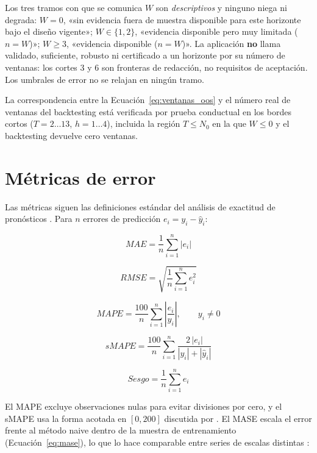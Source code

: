 \documentclass[12pt]{article}
\begin{document}
Los tres tramos con que se comunica $W$ son \emph{descriptivos} y ninguno niega ni degrada: $W = 0$, «sin evidencia fuera de muestra disponible para este horizonte bajo el dise\~no vigente»; $W \in \{1,2\}$, «evidencia disponible pero muy limitada ($n=W$)»; $W \geq 3$, «evidencia disponible ($n=W$)». La aplicaci\'on \textbf{no} llama validado, suficiente, robusto ni certificado a un horizonte por su n\'umero de ventanas: los cortes 3 y 6 son fronteras de redacci\'on, no requisitos de aceptaci\'on. Los umbrales de error no se relajan en ning\'un tramo.

La correspondencia entre la Ecuaci\'on~\ref{eq:ventanas_oos} y el n\'umero real de ventanas del backtesting est\'a verificada por prueba conductual en los bordes cortos ($T = 2 \dots 13$, $h = 1 \dots 4$), incluida la regi\'on $T \leq N_0$ en la que $W \leq 0$ y el backtesting devuelve cero ventanas.

\section{M\'etricas de error}
\label{sec:metricas}

Las m\'etricas siguen las definiciones est\'andar del an\'alisis de exactitud de pron\'osticos \citep{hyndman_koehler2006,hyndman2021fpp3}. Para $n$ errores de predicci\'on $e_i = y_i - \hat{y}_i$:

\begin{equation}
MAE = \frac{1}{n}\sum_{i=1}^{n}|e_i|
\label{eq:mae}
\end{equation}

\begin{equation}
RMSE = \sqrt{\frac{1}{n}\sum_{i=1}^{n}e_i^{2}}
\label{eq:rmse}
\end{equation}

\begin{equation}
MAPE = \frac{100}{n}\sum_{i=1}^{n}\left|\frac{e_i}{y_i}\right|, \qquad y_i \neq 0
\label{eq:mape}
\end{equation}

\begin{equation}
sMAPE = \frac{100}{n}\sum_{i=1}^{n}\frac{2\,|e_i|}{|y_i|+|\hat{y}_i|}
\label{eq:smape}
\end{equation}

\begin{equation}
Sesgo = \frac{1}{n}\sum_{i=1}^{n} e_i
\label{eq:sesgo}
\end{equation}

El MAPE excluye observaciones nulas para evitar divisiones por cero, y el sMAPE usa la forma acotada en $[0,200]$ discutida por \citep{hyndman_koehler2006}. El MASE escala el error frente al m\'etodo naive dentro de la muestra de entrenamiento (Ecuaci\'on~\ref{eq:mase}), lo que lo hace comparable entre series de escalas distintas \citep{hyndman_koehler2006}:
\end{document}
